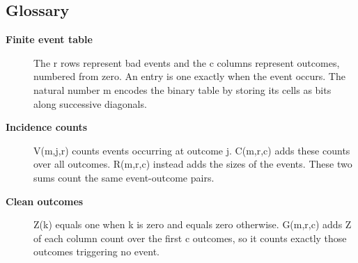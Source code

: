 \documentclass{article}
\theoremstyle{paperresult}
\begin{document}
\subsection*{Glossary}
\begin{description}
\item[{\normalfont\bfseries Finite event table}] The r rows represent bad events and the c columns represent outcomes, numbered from zero. An entry is one exactly when the event occurs. The natural number m encodes the binary table by storing its cells as bits along successive diagonals.
\item[{\normalfont\bfseries Incidence counts}] V(m,j,r) counts events occurring at outcome j. C(m,r,c) adds these counts over all outcomes. R(m,r,c) instead adds the sizes of the events. These two sums count the same event-outcome pairs.
\item[{\normalfont\bfseries Clean outcomes}] Z(k) equals one when k is zero and equals zero otherwise. G(m,r,c) adds Z of each column count over the first c outcomes, so it counts exactly those outcomes triggering no event.
\end{description}
\end{document}
